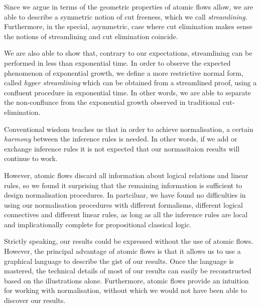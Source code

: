 Since we argue in terms of the geometric properties of atomic flows allow, we are able to describe a symmetric notion of cut freeness, which we call \emph{streamlining}. Furthermore, in the special, asymmetric, case where cut elimination makes sense the notions of streamlining and cut elimination coincide.

We are also able to show that, contrary to our expectations, streamlining can be performed in less than exponential time. In order to observe the expected phenomenon of exponential growth, we define a more restrictive normal form, called \emph{hyper streamlining} which can be obtained from a streamlined proof, using a confluent procedure in exponential time. In other words, we are able to separate the non-conflunce from the exponential growth observed in traditional cut-elimination.

Conventional wisdom teaches us that in order to achieve normalisation, a certain \emph{harmony} between the inference rules is needed. In other words, if we add or exchange inference rules it is not expected that our normasitaion results will continue to work.

However, atomic flows discard all information about logical relations and linear rules, so we found it surprising that the remaining information is sufficient to design normalisation procedures. In partciluar, we have found no difficulties in using our normalisation procedures with different formalisms, different logical connectives and different linear rules, as long as all the inference rules are local and implicationally complete for propositional classical logic.

Strictly speaking, our results could be expressed without the use of atomic flows. However, the principal advantage of atomic flows is that it allows us to use a graphical language to describe the gist of our results. Once the language is mastered, the technical details of most of our results can easily be reconstructed based on the illustrations alone. Furthermore, atomic flows provide an intuition for working with normalisation, without which we would not have been able to discover our results.

